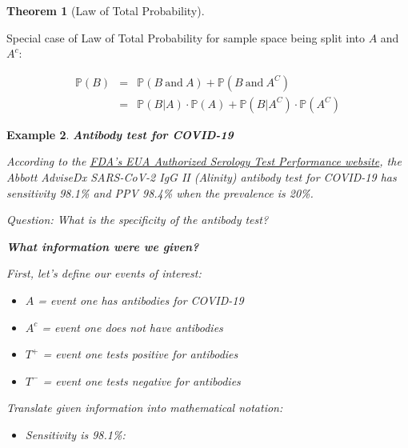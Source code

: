 \documentclass[12pt]{amsart}
\newtheorem{theorem}{Theorem}[section]
\newtheorem{example}[theorem]{Example}
\begin{document}
{\begin{theorem}[Law of Total Probability]
\vspace{0.5cm}

\end{theorem}


Special case of Law of Total Probability for sample space being split into $A$ and $A^c$: 

\[
\begin{array}{ccl}
\mathbb{P}(B)&=&\mathbb{P}(B\ \textrm{and}\ A) + \mathbb{P}(B\ \textrm{and}\ A^C)\\
		   &=& \mathbb{P}(B|A) \cdot \mathbb{P}(A)+ \mathbb{P}(B | A^C)\cdot \mathbb{P}(A^C)
\end{array}
\]


\newpage


\begin{example} \textbf{Antibody test for COVID-19} 

According to the \href{https://www.fda.gov/medical-devices/coronavirus-disease-2019-covid-19-emergency-use-authorizations-medical-devices/eua-authorized-serology-test-performance}{FDA's EUA Authorized Serology Test Performance website}, %
the Abbott AdviseDx SARS-CoV-2 IgG II (Alinity) antibody test for COVID-19 has sensitivity 98.1\% and PPV 98.4\% when the prevalence is 20\%. \newline

Question: What is the specificity of the antibody test?

\vspace{0.5cm}
\textbf{What information were we given?}%

First, let's define our events of interest: 
\begin{itemize}
	\item $A$ = event one has antibodies for COVID-19
	\item $A^c$ = event one does not have antibodies
	\item $T^+$ = event one tests positive for antibodies
	\item $T^-$ = event one tests negative for antibodies
\end{itemize}
\vspace{0.5cm}
Translate given information into mathematical notation:
\begin{itemize}
	\item Sensitivity is 98.1\%:\newline


\end{itemize}
\end{example}}
\end{document}
